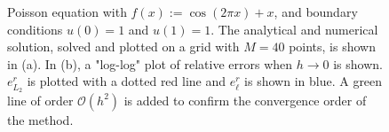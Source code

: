 \begin{figure}
\centering
{}\hspace{0mm}
\hspace{0mm}
\caption{Poisson equation with $f(x) := \cos{(2\pi x)} + x$, and boundary conditions $u(0) = 1$ and $u(1) = 1$. The analytical and numerical solution, solved and plotted on a grid with $M = 40$ points, is shown in (a). In (b), a "log-log" plot of relative errors when $h \rightarrow 0$ is shown. $e^r_{L_2}$ is plotted with a dotted red line and $e^r_\ell$ is shown in blue. A green line of order $\mathcal{O}(h^2)$ is added to confirm the convergence order of the method. }
\end{figure}

